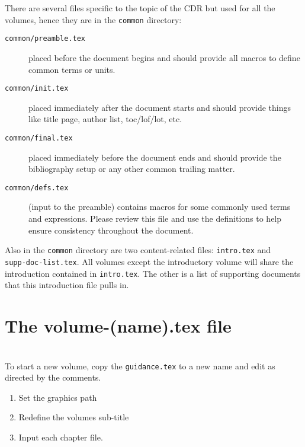 There are several files specific to the topic of the CDR but used for all the volumes, hence 
they are in the \texttt{common} directory:

\begin{description}
\item[\texttt{common/preamble.tex}] placed before the document begins and should provide all macros to define common terms or units.
\item[\texttt{common/init.tex}] placed immediately after the document starts and should provide things like title page, author list, toc/lof/lot, etc.
\item[\texttt{common/final.tex}] placed immediately before the document ends and should provide the bibliography setup or any other common trailing matter.
\item[\texttt{common/defs.tex}] (input to the preamble) contains macros for some commonly 
used terms and expressions. Please review this file and use the definitions to help ensure consistency
throughout the document.
\end{description}

Also in the \texttt{common} directory are two content-related files: \texttt{intro.tex} and \\
\texttt{supp-doc-list.tex}.  All volumes except the introductory volume will share the introduction
contained in \texttt{intro.tex}.  The other is a list of supporting documents that this
introduction file pulls in.

\section{The volume-(name).tex file}

 \\

To start a new volume, copy the \texttt{guidance.tex} to a new
name and edit as directed by the comments.  

\begin{enumerate}
\item Set the graphics path
\item Redefine the volumes sub-title
\item Input each chapter file.
\end{enumerate}

